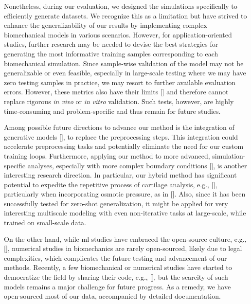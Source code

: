 Nonetheless, during our evaluation, we designed the simulations specifically to efficiently generate datasets. We recognize this as a limitation but have strived to enhance the generalizability of our results by implementing complex biomechanical models in various scenarios. However, for application-oriented studies, further research may be needed to devise the best strategies for generating the most informative training samples corresponding to each biomechanical simulation. Since sample-wise validation of the model may not be generalizable or even feasible, especially in large-scale testing where we may have zero testing samples in practice, we may resort to further available evaluation errors. However, these metrics also have their limits [\cite{barocas2023}] and therefore cannot replace rigorous \textit{in vivo} or \textit{in vitro} validation. Such tests, however, are highly time-consuming and problem-specific and thus remain for future studies.

Among possible future directions to advance our method is the integration of generative models [\cite{rezende2014,kingma2014}], to replace the preprocessing steps. This integration could accelerate preprocessing tasks and potentially eliminate the need for our custom training loops. Furthermore, applying our method to more advanced, simulation-specific analyses, especially with more complex boundary conditions [\cite{lenhart2015}], is another interesting research direction. In particular, our hybrid method has significant potential to expedite the repetitive process of cartilage analysis, e.g., [\cite{elahi2021}], particularly when incorporating osmotic pressure, as in [\cite{elahi2023}]. Also, since it has been successfully tested for zero-shot generalization, it might be applied for very interesting multiscale modeling with even non-iterative tasks at large-scale, while trained on small-scale data.

On the other hand, while \ac{ml} studies have embraced the open-source culture, e.g., [\cite{panfilov2019,desai2019,desai2021,thomas2021,panfilov2022}], numerical studies in biomechanics are rarely open-sourced, likely due to legal complexities, which complicates the future testing and advancement of our methods. Recently, a few biomechanical or numerical studies have started to democratize the field by sharing their code, e.g., [\cite{fehervary2020,maes2023,chokhandre2021}], but the scarcity of such models remains a major challenge for future progress. As a remedy, we have open-sourced most of our data, accompanied by detailed documentation.

